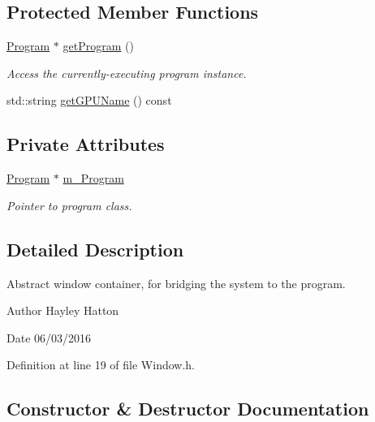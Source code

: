 \subsection*{Protected Member Functions}
\begin{DoxyCompactItemize}
\item 
\hyperlink{class_program}{Program} $\ast$ \hyperlink{class_window_afbdf70548ae7b866e0b535cef8282c62}{get\+Program} ()
\begin{DoxyCompactList}\small\item\em Access the currently-\/executing program instance. \end{DoxyCompactList}\item 
std\+::string \hyperlink{class_window_a0d02e0859c746105a40bf8b60584908d}{get\+G\+P\+U\+Name} () const 
\end{DoxyCompactItemize}
\subsection*{Private Attributes}
\begin{DoxyCompactItemize}
\item 
\hyperlink{class_program}{Program} $\ast$ \hyperlink{class_window_afcae84b6b4fbc790bae19b794809f98b}{m\+\_\+\+Program}
\begin{DoxyCompactList}\small\item\em Pointer to program class. \end{DoxyCompactList}\end{DoxyCompactItemize}


\subsection{Detailed Description}
Abstract window container, for bridging the system to the program. 

\begin{DoxyAuthor}{Author}
Hayley Hatton 
\end{DoxyAuthor}
\begin{DoxyDate}{Date}
06/03/2016 
\end{DoxyDate}


Definition at line 19 of file Window.\+h.



\subsection{Constructor \& Destructor Documentation}
